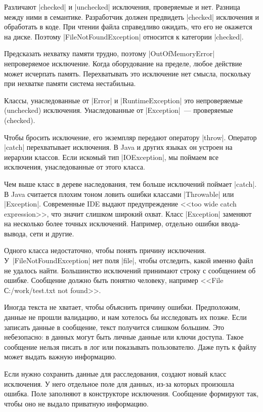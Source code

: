 Различают \spverb|checked| и \spverb|unchecked| исключения, проверяемые и
нет. Разница между ними в семантике. Разработчик должен предвидеть
\spverb|checked| исключения и обработать в коде. При чтении файла справедливо
ожидать, что его не окажется на диске. Поэтому \spverb|FileNotFoundException|
относится к категории \spverb|checked|.

Предсказать нехватку памяти трудно, поэтому \spverb|OutOfMemoryError|
непроверяемое исключение. Когда оборудование на пределе, любое действие может
исчерпать память. Перехватывать это исключение нет смысла, поскольку при
нехватке памяти система нестабильна.

Классы, унаследованные от \spverb|Error| и \spverb|RuntimeException| это
непроверяемые (unchecked) исключения. Унаследованные от \spverb|Exception|~---
проверяемые (checked).

Чтобы бросить исключение, его экземпляр передают оператору
\spverb|throw|. Оператор \spverb|catch| перехватывает исключения. В Java и
других языках он устроен на иерархии классов. Если искомый тип
\spverb|IOException|, мы поймаем все исключения, унаследованные от этого класса.

Чем выше класс в дереве наследования, тем больше исключений поймает
\spverb|catch|. В Java считается плохим тоном ловить ошибки классами
\spverb|Throwable| или \spverb|Exception|. Современные IDE выдают предупреждение
<<too wide catch expression>>, что значит слишком широкий охват. Класс
\spverb|Exception| заменяют на несколько более точных исключений. Например,
отдельно ошибки ввода-вывода, сети и другие.

Одного класса недостаточно, чтобы понять причину
исключения. У~\spverb|FileNotFoundException| нет поля \spverb|file|, чтобы
отследить, какой именно файл не удалось найти. Большинство исключений принимают
строку с сообщением об ошибке. Сообщение должно быть понятно человеку, например
<<File С:/work/test.txt not found>>.

Иногда текста не хватает, чтобы объяснить причину ошибки. Предположим, данные не
прошли валидацию, и нам хотелось бы исследовать их позже. Если записать данные в
сообщение, текст получится слишком большим. Это небезопасно: в данных могут быть
личные данные или ключи доступа. Такое сообщение нельзя писать в лог или
показывать пользователю. Даже путь к файлу может выдать важную информацию.

Если нужно сохранить данные для расследования, создают новый класс исключения. У
него отдельное поле для данных, из-за которых произошла ошибка. Поле заполняют в
конструкторе исключения. Сообщение формируют так, чтобы оно не выдало приватную
информацию.


